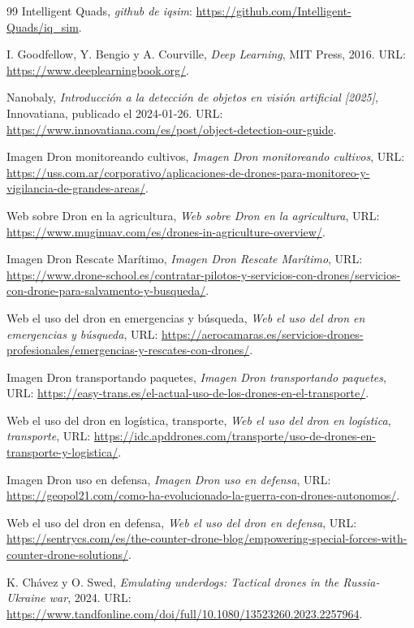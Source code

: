 \begin{thebibliography}{99}
 Intelligent Quads, \textit{github de iqsim}: \url{https://github.com/Intelligent-Quads/iq_sim}.

 I. Goodfellow, Y. Bengio y A. Courville, \textit{Deep Learning}, MIT Press, 2016. URL: \url{https://www.deeplearningbook.org/}.

 Nanobaly, \textit{Introducción a la detección de objetos en visión artificial [2025]}, Innovatiana, publicado el 2024-01-26. URL: \url{https://www.innovatiana.com/es/post/object-detection-our-guide}.

 Imagen Dron monitoreando cultivos, \textit{Imagen Dron monitoreando cultivos}, URL: \url{https://uss.com.ar/corporativo/aplicaciones-de-drones-para-monitoreo-y-vigilancia-de-grandes-areas/}.

 Web sobre Dron en la agricultura, \textit{Web sobre Dron en la agricultura}, URL: \url{https://www.muginuav.com/es/drones-in-agriculture-overview/}.

 Imagen Dron Rescate Marítimo, \textit{Imagen Dron Rescate Marítimo}, URL: \url{https://www.drone-school.es/contratar-pilotos-y-servicios-con-drones/servicios-con-drone-para-salvamento-y-busqueda/}.

 Web el uso del dron en emergencias y búsqueda, \textit{Web el uso del dron en emergencias y búsqueda}, URL: \url{https://aerocamaras.es/servicios-drones-profesionales/emergencias-y-rescates-con-drones/}.

 Imagen Dron transportando paquetes, \textit{Imagen Dron transportando paquetes}, URL: \url{https://easy-trans.es/el-actual-uso-de-los-drones-en-el-transporte/}.

 Web el uso del dron en logística, transporte, \textit{Web el uso del dron en logística, transporte}, URL: \url{https://idc.apddrones.com/transporte/uso-de-drones-en-transporte-y-logistica/}.

 Imagen Dron uso en defensa, \textit{Imagen Dron uso en defensa}, URL: \url{https://geopol21.com/como-ha-evolucionado-la-guerra-con-drones-autonomos/}.

 Web el uso del dron en defensa, \textit{Web el uso del dron en defensa}, URL: \url{https://sentrycs.com/es/the-counter-drone-blog/empowering-special-forces-with-counter-drone-solutions/}.

 K. Chávez y O. Swed, \textit{Emulating underdogs: Tactical drones in the Russia-Ukraine war}, 2024. URL: \url{https://www.tandfonline.com/doi/full/10.1080/13523260.2023.2257964}.


\end{thebibliography}
